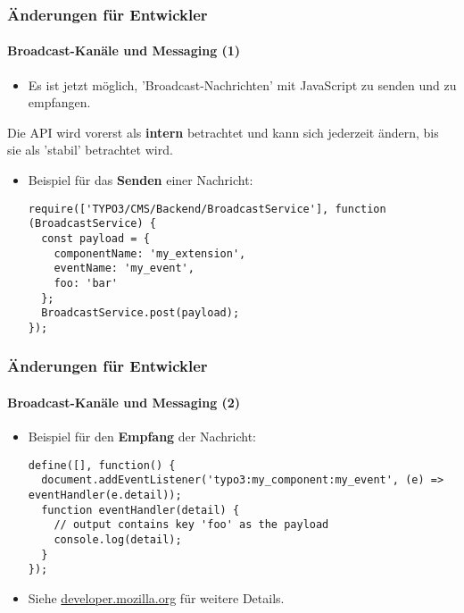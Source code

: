 \begin{frame}[fragile]
	\frametitle{Änderungen für Entwickler}
	\framesubtitle{Broadcast-Kanäle und Messaging (1)}

	\lstset{basicstyle=\tiny\ttfamily}

	\begin{itemize}
		\item Es ist jetzt möglich, 'Broadcast-Nachrichten' mit JavaScript zu senden und zu empfangen.
	\end{itemize}

	\vspace{-0.2cm}
	\begingroup
		\color{red}
			\begin{center}
				Die API wird vorerst als \textbf{intern} betrachtet\newline
				und kann sich jederzeit ändern, bis sie als 'stabil' betrachtet wird.
			\end{center}
	\endgroup

	\begin{itemize}
		\item Beispiel für das \textbf{Senden} einer Nachricht:

\begin{lstlisting}
require(['TYPO3/CMS/Backend/BroadcastService'], function (BroadcastService) {
  const payload = {
    componentName: 'my_extension',
    eventName: 'my_event',
    foo: 'bar'
  };
  BroadcastService.post(payload);
});
\end{lstlisting}

	\end{itemize}

\end{frame}


\begin{frame}[fragile]
	\frametitle{Änderungen für Entwickler}
	\framesubtitle{Broadcast-Kanäle und Messaging (2)}

	\lstset{basicstyle=\tiny\ttfamily}

	\begin{itemize}
		\item Beispiel für den \textbf{Empfang} der Nachricht:

\begin{lstlisting}
define([], function() {
  document.addEventListener('typo3:my_component:my_event', (e) => eventHandler(e.detail));
  function eventHandler(detail) {
    // output contains key 'foo' as the payload
    console.log(detail);
  }
});
\end{lstlisting}

		\item Siehe \href{https://developer.mozilla.org/en-US/docs/Web/API/Broadcast_Channel_API}{developer.mozilla.org} für weitere Details.

	\end{itemize}

\end{frame}

